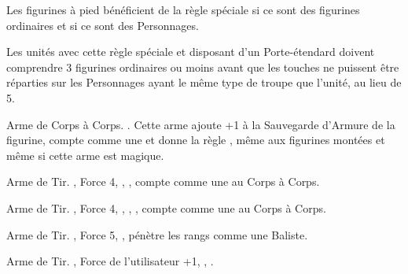 \newcommand{\smashrule}{%
Choisissez une figurine en contact socle à socle avec le Géant dans l'unité sélectionnée. Cette figurine subit une blessure avec \armourpiercing{6}. Si la figurine n'a pas encore attaqué, elle ne peut pas le faire au cours de cette manche. Si la figurine a déjà réalisé ses attaques, elle ne pourra pas attaquer au cours du tour de  joueur à venir.
}







\startarmyspecialrules

\armyspecialruleentry{\sonsoftheavalanche}

Les figurines à pied bénéficient de la règle spéciale  si ce sont des figurines ordinaires et  si ce sont des Personnages.


\armyspecialruleentry{\scraplinglookout}

Les unités avec cette règle spéciale et disposant d'un Porte-étendard doivent comprendre 3 figurines ordinaires ou moins avant que les touches ne puissent être réparties sur les Personnages ayant le même type de troupe que l'unité, au lieu de 5.

\closearmyspecialrules

\vspace*{1.5cm}
\startarmyarmoury

\startitemlistonecol

\listitemonecol{\ironfist} Arme de Corps à Corps. \requirestwohands{}. Cette arme ajoute +1 à la Sauvegarde d'Armure de la figurine, compte comme une \pw{} et donne la règle \parry{}, même aux figurines montées et même si cette arme est magique.

\listitemonecol{\ogrepistol} Arme de Tir. , Force 4, \quicktofire{}, , compte comme une \pw{} au Corps à Corps.

\listitemonecol{\braceofogrepistols} Arme de Tir. , Force 4, \quicktofire{}, , , compte comme une \pw{} au Corps à Corps.

\listitemonecol{\ogrecrossbow} Arme de Tir. , Force 5, , pénètre les rangs comme une Baliste.

\listitemonecol{\huntingspear} Arme de Tir. , Force de l'utilisateur +1, \quicktofire{}, .

\enditemlistonecol

